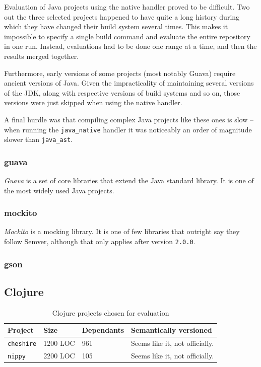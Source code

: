 \documentclass{l4proj}
\newcommand\genericstyle{\lstset{basicstyle=\ttm}}
\newcommand\codeinline[1]{{\genericstyle\lstinline!#1!}}
\begin{document}
Evaluation of Java projects using the native handler proved to be difficult.
Two out the three selected projects happened to have quite a long
history during which they have changed their build system several
times. This makes it impossible to specify a single build command and
evaluate the entire repository in one run. Instead, evaluations had to
be done one range at a time, and then the results merged together.

Furthermore, early versions of some projects (most notably Guava)
require ancient versions of Java. Given the impracticality of
maintaining several versions of the JDK, along with respective
versions of build systems and so on, those versions were just skipped
when using the native handler.

A final hurdle was that compiling complex Java projects like these
ones is slow -- when running the \codeinline{java_native} handler it
was noticeably an order of magnitude slower than \codeinline{java_ast}.

\subsubsection{guava}

\textit{Guava} \cite{Guava} is a set of core libraries that extend the
Java standard library. It is one of the most widely used Java
projects.

\subsubsection{mockito}

\textit{Mockito} \cite{Mockito} is a mocking library. It is one of few
libraries that outright say they follow Semver, although that only
applies after version \codeinline{2.0.0}.

\subsubsection{gson}

\subsection{Clojure}

\begin{table}[H]
\centering
\caption{Clojure projects chosen for evaluation}
\label{ClojureProjectsForEvaluation}
\begin{tabular}{|l|l|l|p{10cm}|}
\hline
\textbf{Project} & \textbf{Size} & \textbf{Dependants} & \textbf{Semantically versioned} \\
\hline
\codeinline{cheshire} & 1200 LOC & 961 & Seems like it, not
officially. \\
\codeinline{nippy} & 2200 LOC & 105 & Seems like it, not officially. \\
\hline
\end{tabular}
\end{table}
\end{document}
